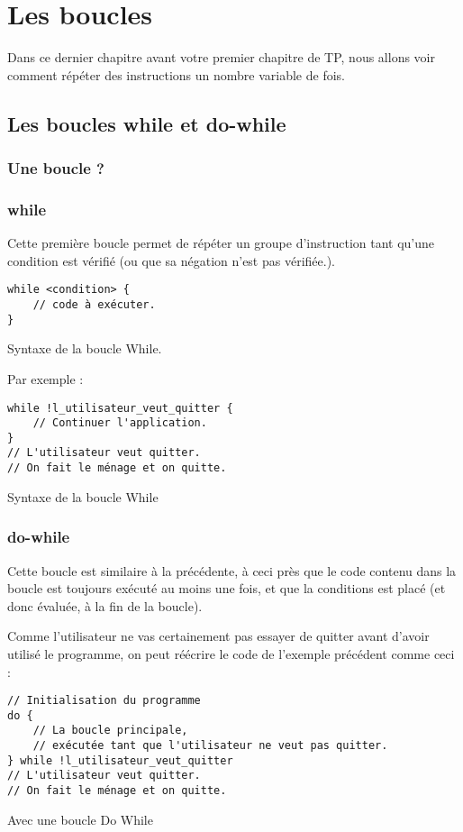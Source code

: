 \chapter{Les boucles}
Dans ce dernier chapitre avant votre premier chapitre de TP,
nous allons voir comment répéter des instructions un nombre variable de fois.
\section{Les boucles while et do-while}
\subsection{Une boucle ?}

\subsection{while}
Cette première boucle permet de répéter un groupe d'instruction tant qu'une condition est vérifié (ou que sa négation n'est pas vérifiée.).

\begin{listing}[H]
\begin{verbatim}
while <condition> {
    // code à exécuter.
}
\end{verbatim}
\caption{Syntaxe de la boucle While.}
\end{listing}

Par exemple :
\begin{listing}[h]
\begin{verbatim}
while !l_utilisateur_veut_quitter {
    // Continuer l'application.
}
// L'utilisateur veut quitter.
// On fait le ménage et on quitte.
\end{verbatim}
\caption{Syntaxe de la boucle While}
\end{listing}
\subsection{do-while}
Cette boucle est similaire à la précédente, à ceci près que le code contenu dans la boucle est toujours exécuté au moins une fois, et que la conditions est placé (et donc évaluée, à la fin de la boucle).

Comme l'utilisateur ne vas certainement pas essayer de quitter avant d'avoir utilisé le programme, on peut réécrire le code de l'exemple précédent comme ceci :
\begin{listing}[H]
\begin{verbatim}
// Initialisation du programme
do {
    // La boucle principale,
    // exécutée tant que l'utilisateur ne veut pas quitter.
} while !l_utilisateur_veut_quitter
// L'utilisateur veut quitter.
// On fait le ménage et on quitte.
\end{verbatim}
\caption{Avec une boucle Do While}
\end{listing}

